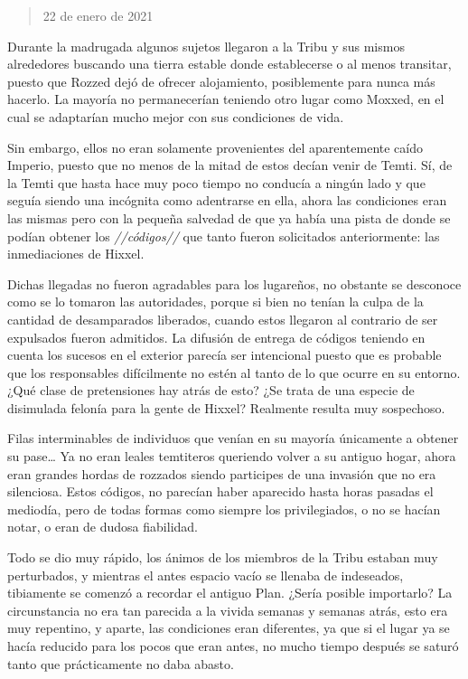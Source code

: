 \documentclass[
  spanish,
]{book}
\begin{document}
\begin{quote}
22 de enero de 2021
\end{quote}

Durante la madrugada algunos sujetos llegaron a la Tribu y sus mismos alrededores buscando una tierra estable donde establecerse o al menos transitar, puesto que Rozzed dejó de ofrecer alojamiento, posiblemente para nunca más hacerlo. La mayoría no permanecerían teniendo otro lugar como Moxxed, en el cual se adaptarían mucho mejor con sus condiciones de vida.

Sin embargo, ellos no eran solamente provenientes del aparentemente caído Imperio, puesto que no menos de la mitad de estos decían venir de Temti. Sí, de la Temti que hasta hace muy poco tiempo no conducía a ningún lado y que seguía siendo una incógnita como adentrarse en ella, ahora las condiciones eran las mismas pero con la pequeña salvedad de que ya había una pista de donde se podían obtener los \emph{//códigos//} que tanto fueron solicitados anteriormente: las inmediaciones de Hixxel.

Dichas llegadas no fueron agradables para los lugareños, no obstante se desconoce como se lo tomaron las autoridades, porque si bien no tenían la culpa de la cantidad de desamparados liberados, cuando estos llegaron al contrario de ser expulsados fueron admitidos. La difusión de entrega de códigos teniendo en cuenta los sucesos en el exterior parecía ser intencional puesto que es probable que los responsables difícilmente no estén al tanto de lo que ocurre en su entorno. ¿Qué clase de pretensiones hay atrás de esto? ¿Se trata de una especie de disimulada felonía para la gente de Hixxel? Realmente resulta muy sospechoso.

Filas interminables de individuos que venían en su mayoría únicamente a obtener su pase\ldots{} Ya no eran leales temtiteros queriendo volver a su antiguo hogar, ahora eran grandes hordas de rozzados siendo participes de una invasión que no era silenciosa. Estos códigos, no parecían haber aparecido hasta horas pasadas el mediodía, pero de todas formas como siempre los privilegiados, o no se hacían notar, o eran de dudosa fiabilidad.

Todo se dio muy rápido, los ánimos de los miembros de la Tribu estaban muy perturbados, y mientras el antes espacio vacío se llenaba de indeseados, tibiamente se comenzó a recordar el antiguo Plan. ¿Sería posible importarlo? La circunstancia no era tan parecida a la vivida semanas y semanas atrás, esto era muy repentino, y aparte, las condiciones eran diferentes, ya que si el lugar ya se hacía reducido para los pocos que eran antes, no mucho tiempo después se saturó tanto que prácticamente no daba abasto.
\end{document}
